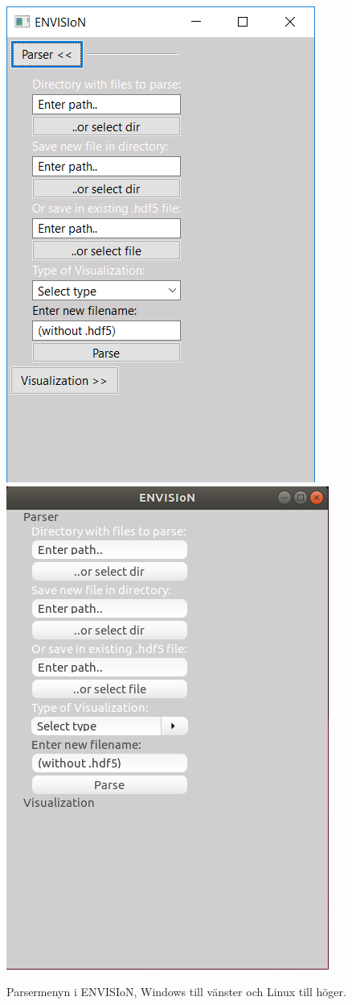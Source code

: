 \begin{figure}[H]
  \centering
    \includegraphics[scale=0.5]{images/GUI/GUIParserWin.png}
    \includegraphics[scale=0.367]{images/GUI/GUIParserLinux.png}
    \caption{Parsermenyn i ENVISIoN, Windows till vänster och Linux till höger.}
    \label{fig:GUIParser}
\end{figure}

